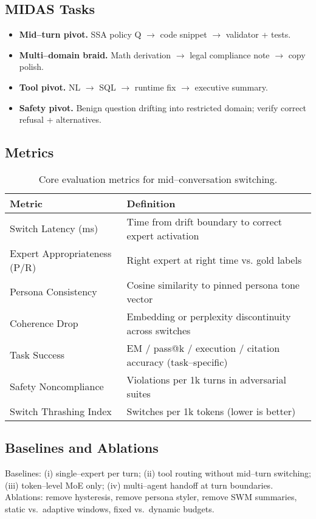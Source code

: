 \documentclass[11pt]{article}
\begin{document}
\subsection{MIDAS Tasks}
\begin{itemize}[leftmargin=*,itemsep=2pt,topsep=2pt]
\item \textbf{Mid--turn pivot.} SSA policy Q $\rightarrow$ code snippet $\rightarrow$ validator + tests.
\item \textbf{Multi--domain braid.} Math derivation $\rightarrow$ legal compliance note $\rightarrow$ copy polish.
\item \textbf{Tool pivot.} NL $\rightarrow$ SQL $\rightarrow$ runtime fix $\rightarrow$ executive summary.
\item \textbf{Safety pivot.} Benign question drifting into restricted domain; verify correct refusal + alternatives.
\end{itemize}

\subsection{Metrics}
\begin{table}[h]
\centering
\small
\begin{tabular}{@{}ll@{}}
\toprule
\textbf{Metric} & \textbf{Definition} \\
\midrule
Switch Latency (ms) & Time from drift boundary to correct expert activation \\
Expert Appropriateness (P/R) & Right expert at right time vs. gold labels \\
Persona Consistency & Cosine similarity to pinned persona tone vector \\
Coherence Drop & Embedding or perplexity discontinuity across switches \\
Task Success & EM / pass@k / execution / citation accuracy (task--specific) \\
Safety Noncompliance & Violations per 1k turns in adversarial suites \\
Switch Thrashing Index & Switches per 1k tokens (lower is better) \\
\bottomrule
\end{tabular}
\caption{Core evaluation metrics for mid--conversation switching.}
\end{table}

\subsection{Baselines and Ablations}
Baselines: (i) single--expert per turn; (ii) tool routing without mid--turn switching; (iii) token--level MoE only; (iv) multi--agent handoff at turn boundaries. Ablations: remove hysteresis, remove persona styler, remove SWM summaries, static vs.\ adaptive windows, fixed vs.\ dynamic budgets.
\end{document}

